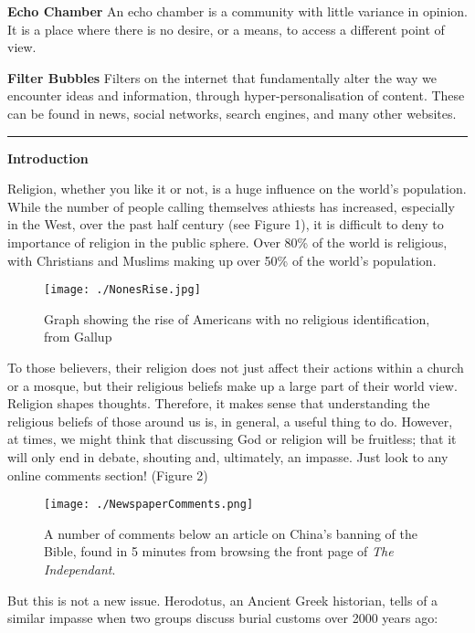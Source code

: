 \documentclass[]{article}
\begin{document}
\textbf{Echo Chamber} An echo chamber is a community with little
variance in opinion. It is a place where there is no desire, or a means,
to access a different point of view.\autocite{Thwaitenewtheoryecho2018}

\textbf{Filter Bubbles } Filters on the internet that fundamentally
alter the way we encounter ideas and information, through
hyper-personalisation of content. These can be found in news, social
networks, search engines, and many other websites.

\begin{center}\rule{0.5\linewidth}{\linethickness}\end{center}

\textbf{Introduction}

Religion, whether you like it or not, is a huge influence on the world's
population. While the number of people calling themselves athiests has
increased, especially in the West, over the past half century (see
Figure 1), it is difficult to deny to importance of religion in the
public sphere. Over 80\% of the world is religious, with Christians and
Muslims making up over 50\% of the world's
population\autocite{HackettChristiansremainworld2017}.

\begin{figure}
\centering
\texttt{[image: ./NonesRise.jpg]}
\caption{Graph showing the rise of Americans with no religious
identification, from Gallup\autocite{GallupThisEasterSmaller}}
\end{figure}

To those believers, their religion does not just affect their actions
within a church or a mosque, but their religious beliefs make up a large
part of their world view. Religion shapes thoughts. Therefore, it makes
sense that understanding the religious beliefs of those around us is, in
general, a useful thing to do. However, at times, we might think that
discussing God or religion will be fruitless; that it will only end in
debate, shouting and, ultimately, an impasse. Just look to any online
comments section! (Figure 2)

\begin{figure}
\centering
\texttt{[image: ./NewspaperComments.png]}
\caption{A number of comments below an article on China's banning of the
Bible, found in 5 minutes from browsing the front page of \emph{The
Independant}.\autocite{OppenheimChinacrackssales2018}}
\end{figure}

But this is not a new issue. Herodotus, an Ancient Greek historian,
tells of a similar impasse when two groups discuss burial customs over
2000 years ago:
\end{document}
